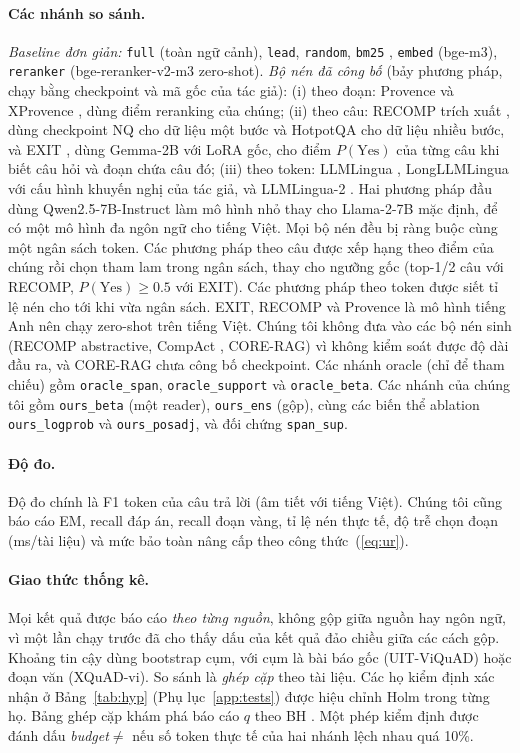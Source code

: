 \documentclass[11pt]{article}
\newcommand{\arm}[1]{\texttt{#1}}
\begin{document}
\paragraph{Các nhánh so sánh.} \emph{Baseline đơn giản:} \arm{full} (toàn ngữ cảnh),
\arm{lead}, \arm{random}, \arm{bm25} \citep{robertson2009bm25}, \arm{embed} (bge-m3),
\arm{reranker} (bge-reranker-v2-m3 zero-shot). \emph{Bộ nén đã công bố} (bảy phương
pháp, chạy bằng checkpoint và mã gốc của tác giả):
(i) theo đoạn: Provence và XProvence \citep{chirkova2025provence,xprovence2026}, dùng điểm
reranking của chúng;
(ii) theo câu: RECOMP trích xuất \citep{xu2024recomp}, dùng checkpoint NQ cho dữ liệu một bước
và HotpotQA cho dữ liệu nhiều bước, và EXIT \citep{hwang2025exit}, dùng Gemma-2B với LoRA
gốc, cho điểm $P(\text{Yes})$ của từng câu khi biết câu hỏi và đoạn chứa câu đó;
(iii) theo token: LLMLingua \citep{jiang2023llmlingua}, LongLLMLingua
\citep{jiang2024longllmlingua} với cấu hình khuyến nghị của tác giả, và LLMLingua-2
\citep{pan2024llmlingua2}. Hai phương pháp đầu dùng Qwen2.5-7B-Instruct \citep{qwen25}
làm mô hình nhỏ thay cho Llama-2-7B mặc định, để có một mô hình đa ngôn ngữ cho tiếng Việt.
Mọi bộ nén đều bị ràng buộc cùng một ngân sách token. Các phương pháp theo câu được xếp hạng
theo điểm của chúng rồi chọn tham lam trong ngân sách, thay cho ngưỡng gốc (top-1/2 câu với
RECOMP, $P(\text{Yes})\ge0.5$ với EXIT). Các phương pháp theo token được siết tỉ lệ nén cho
tới khi vừa ngân sách. EXIT, RECOMP và Provence là mô hình tiếng Anh nên chạy zero-shot trên
tiếng Việt. Chúng tôi không đưa vào các bộ nén sinh (RECOMP abstractive, CompAct
\citep{yoon2024compact}, CORE-RAG) vì không kiểm soát được độ dài đầu ra, và CORE-RAG chưa
công bố checkpoint. Các nhánh oracle (chỉ để tham chiếu) gồm
\arm{oracle\_span}, \arm{oracle\_support} và \arm{oracle\_beta}. Các nhánh của chúng tôi
gồm \arm{ours\_beta} (một reader), \arm{ours\_ens} (gộp), cùng các biến thể ablation
\arm{ours\_logprob} và \arm{ours\_posadj}, và đối chứng \arm{span\_sup}.

\paragraph{Độ đo.} Độ đo chính là F1 token của câu trả lời (âm tiết với tiếng
Việt). Chúng tôi cũng báo cáo EM, recall đáp án, recall đoạn vàng, tỉ lệ nén thực tế,
độ trễ chọn đoạn (ms/tài liệu) và mức bảo toàn nâng cấp theo công thức~(\ref{eq:ur}).

\paragraph{Giao thức thống kê.} Mọi kết quả được báo cáo \emph{theo từng nguồn},
không gộp giữa nguồn hay ngôn ngữ, vì một lần chạy trước đã cho thấy dấu của kết quả đảo chiều giữa các
cách gộp. Khoảng tin cậy dùng bootstrap cụm, với cụm là bài báo gốc (UIT-ViQuAD) hoặc
đoạn văn (XQuAD-vi). So sánh là \emph{ghép cặp} theo tài liệu. Các họ kiểm định xác nhận ở
Bảng~\ref{tab:hyp} (Phụ lục~\ref{app:tests}) được hiệu chỉnh Holm trong từng họ. Bảng ghép cặp khám phá báo cáo
$q$ theo BH \citep{benjamini1995fdr}. Một phép kiểm định được đánh dấu
\emph{budget${\neq}$} nếu số token thực tế của hai nhánh lệch nhau quá 10\%.
\end{document}
